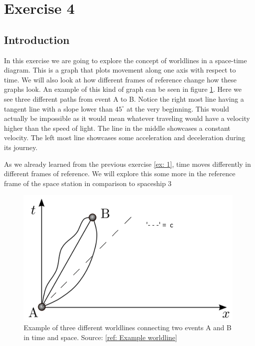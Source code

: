 \documentclass[reprint,english,notitlepage]{revtex4-2}
\begin{document}
\section{Exercise 4}

  \subsection{Introduction}
  In this exercise we are going to explore the concept of worldlines in a space-time diagram. This is a graph that plots movement along one axis with respect to time. We will also look at how different frames of reference change how these graphs look. An example of this kind of graph can be seen in figure \ref{fig: WL Example}. Here we see three different paths from event A to B. Notice the right most line having a tangent line with a slope lower than $ 45^{∘} $ at the very beginning. This would actually be impossible as it would mean whatever traveling would have a velocity higher than the speed of light. The line in the middle showcases a constant velocity. The left most line showcases some acceleration and deceleration during its journey. 
  
  As we already learned from the previous exercise \ref{ex: 1}, time moves differently in different frames of reference. We will explore this some more in the reference frame of the space station in comparison to spaceship 3
  
  
  \begin{figure}[h!]
    \centering
    \includegraphics[scale = .5]{figures/worldline_example.png}
    \caption{Example of three different worldlines connecting two events A and B in time and space. Source: \ref{ref: Example worldline}}
    \label{fig: WL Example}
  \end{figure}
  
\end{document}
